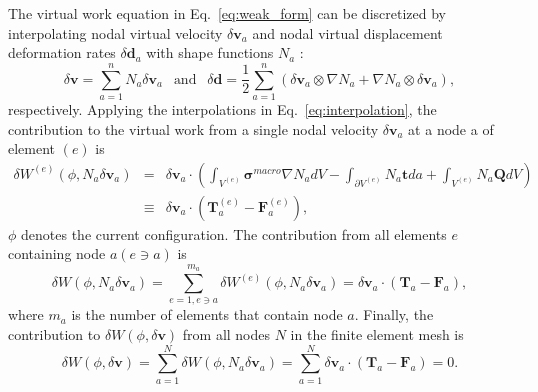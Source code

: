 The virtual work equation in Eq.\ \eqref{eq:weak_form} can be discretized by interpolating nodal virtual velocity $\delta \pmb{v}_a$ and nodal virtual displacement deformation rates $\delta \pmb{d}_a$ with shape functions $N_a$ \cite{JavierBonet:2008uxa}:
%
\begin{equation}
\delta \pmb{v} = \sum_{a=1}^n N_a \delta \pmb{v}_a \ \ \text{ and } \ \ \delta \pmb{d} = \frac{1}{2}\sum_{a=1}^n \left(\delta \pmb{v}_a \otimes \nabla N_a + \nabla N_a \otimes \delta \pmb{v}_a\right),
\label{eq:interpolation}
\end{equation}
%
respectively. Applying the interpolations in Eq.\ \eqref{eq:interpolation}, the contribution to the virtual work from a single nodal velocity $\delta \pmb{v}_a$ at a node a of element $(e)$ is 
%
\begin{eqnarray}
\delta W^{(e)}(\phi, N_a \delta \pmb{v}_a) &=& \delta \pmb{v}_a \cdot \left( \int_{V^{(e)}}\pmb{\sigma}^{macro} \nabla N_a dV - \int_{\partial V^{(e)}} N_a \pmb{t} da + \int_{V^{(e)}} N_a \pmb{Q}dV \right) \nonumber\\
%
&\equiv& \delta \pmb{v}_a \cdot \left(\pmb{T}^{(e)}_a - \pmb{F}^{(e)}_a\right),
\end{eqnarray}
%
$\phi$ denotes the current configuration. The contribution from all elements $e$ containing node $a (e \ni a)$ is 
%
\begin{equation}
\delta W(\phi, N_a \delta \pmb{v}_a) = \sum_{e=1, e\ni a}^{m_a} \delta W^{(e)}(\phi, N_a \delta \pmb{v}_a) = \delta \pmb{v}_a \cdot \left(\pmb{T}_a - \pmb{F}_a\right),
\end{equation}
%
where $m_a$ is the number of elements that contain node $a$. Finally, the contribution to $\delta W(\phi,\delta \pmb{v})$ from all nodes $N$ in the finite element mesh is
%
\begin{equation}
\delta W(\phi,\delta \pmb{v}) = \sum_{a=1}^N \delta W(\phi,N_a\delta\pmb{v}_a)=\sum_{a=1}^N \delta \pmb{v}_a \cdot \left(\pmb{T}_a - \pmb{F}_a\right) = 0.
\label{eq:weak_form_discretized}
\end{equation}
%

